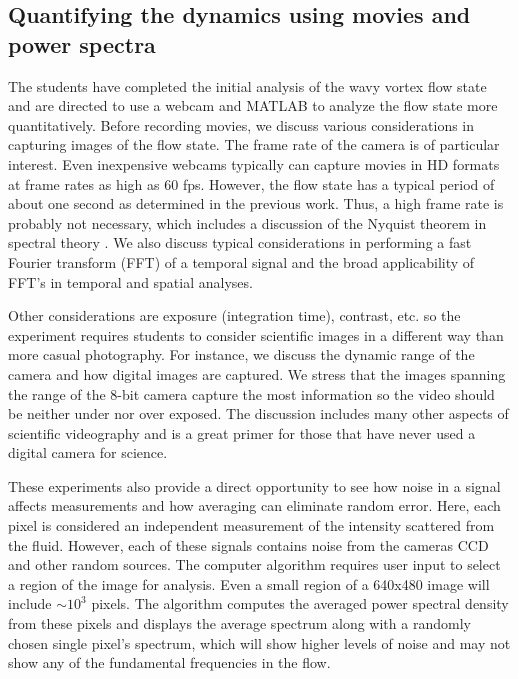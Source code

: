 \documentclass[%
 amsmath,amssymb,
 aps,
floatfix,
aps,prd,longbibliography,
notitlepage
]{revtex4-1}
\begin{document}
\subsection{Quantifying the dynamics using movies and power spectra}%
The students have completed the initial analysis of the wavy vortex flow state and are directed to use a webcam and MATLAB to analyze the flow state more quantitatively. Before recording movies, we discuss various considerations in capturing images of the flow state. The frame rate of the camera is of particular interest. Even inexpensive webcams typically can capture movies in HD formats at frame rates as high as 60 fps. However, the flow state has a typical period of about one second as determined in the previous work. Thus, a high frame rate is probably not necessary, which includes a discussion of the Nyquist theorem in spectral theory \cite{nyquist}. We also discuss typical considerations in performing a fast Fourier transform (FFT) of a temporal signal and the broad applicability of FFT's in temporal and spatial analyses.

Other considerations are exposure (integration time),  contrast, etc. so the experiment requires students to consider scientific images in a different way than more casual photography. For instance, we discuss the dynamic range of the camera and how digital images are captured. We stress that the images spanning the range of the 8-bit camera capture the most information so the video should be neither under nor over exposed. The discussion includes many other aspects of scientific videography and is a great primer for those that have never used a digital camera for science.

These experiments also provide a direct opportunity to see how noise in a signal affects measurements and how averaging can eliminate random error. Here, each pixel is considered an independent measurement of the intensity scattered from the fluid. However, each of these signals contains noise from the cameras CCD and other random sources. The computer algorithm requires user input to select a region of the image for analysis. Even a small region of a 640x480 image will include $\sim 10^3$ pixels. The algorithm computes the averaged power spectral density from these pixels and displays the average spectrum along with a randomly chosen single pixel's spectrum, which will show higher levels of noise and may not show any of the fundamental frequencies in the flow. 
\end{document}
